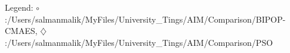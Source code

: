 Legend: {\color{NavyBlue}$\circ$}:/Users/salmanmalik/MyFiles/University\_Tings/AIM/Comparison/BIPOP-CMAES, {\color{Magenta}$\diamondsuit$}:/Users/salmanmalik/MyFiles/University\_Tings/AIM/Comparison/PSO